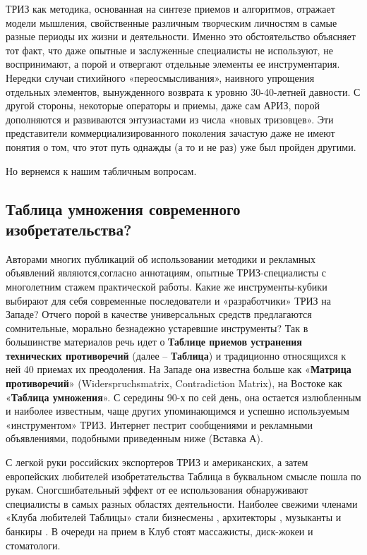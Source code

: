 \documentclass[11pt,a4paper]{article}
\begin{document}
ТРИЗ как методика, основанная на синтезе приемов и алгоритмов, отражает модели
мышления, свойственные различным творческим личностям в самые разные периоды
их жизни и деятельности. Именно это обстоятельство объясняет тот факт, что
даже опытные и заслуженные специалисты не используют, не воспринимают, а порой
и отвергают отдельные элементы ее инструментария. Нередки случаи стихийного
«переосмысливания», наивного упрощения отдельных элементов, вынужденного
возврата к уровню 30-40-летней давности. С другой стороны, некоторые операторы
и приемы, даже сам АРИЗ, порой дополняются и развиваются энтузиастами из числа
«новых тризовцев». Эти представители коммерциализированного поколения зачастую
даже не имеют понятия о том, что этот путь однажды (а то и не раз) уже был
пройден другими.

Но вернемся к нашим табличным вопросам.

\subsection*{Таблица умножения современного изобретательства?}

Авторами многих публикаций об использовании методики и рекламных объявлений
являются,согласно аннотациям, опытные ТРИЗ-специалисты с многолетним стажем
практической работы. Какие же инструменты-кубики выбирают для себя современные
последователи и «разработчики» ТРИЗ на Западе? Отчего порой в качестве
универсальных средств предлагаются сомнительные, морально безнадежно
устаревшие инструменты? Так в большинстве материалов речь идет о
\textbf{Таблице приемов устранения технических противоречий} (далее --
\textbf{Таблица}) и традиционно относящихся к ней 40 приемах их преодоления.
На Западе она известна больше как «\textbf{Матрица противоречий}»
(Widerspruchsmatrix, Contradiction Matrix), на Востоке как «\textbf{Таблица
  умножения}». С середины 90-х по сей день, она остается излюбленным и
наиболее известным, чаще других упоминающимся и успешно используемым
«инструментом» ТРИЗ. Интернет пестрит сообщениями и рекламными объявлениями,
подобными приведенным ниже (Вставка А).

С легкой руки российских экспортеров ТРИЗ и американских, а затем европейских
любителей изобретательства Таблица в буквальном смысле пошла по рукам.
Сногсшибательный эффект от ее использования обнаруживают специалисты в самых
разных областях деятельности. Наиболее свежими членами «Клуба любителей
Таблицы» стали бизнесмены \cite{Leon2005}, архитекторы \cite{Mann2005a},
музыканты \cite{Mann2005b} и банкиры \cite{Stuart2005}. В очереди на прием в
Клуб стоят массажисты, диск-жокеи и стоматологи.
\end{document}
